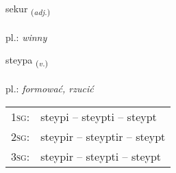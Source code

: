 \documentclass[frontgrid, backgrid]{flacards}\usepackage[]{graphicx}\usepackage[]{xcolor}
\begin{document}
\renewcommand{\flhead}{\vskip5pt \fboxsep=0pt {\small\bfseries\footnotesize Lýsingarorð | przymiotnik}}
\renewcommand{\fcfoot}{\vskip5pt \fboxsep=0pt \hspace{2pt}{\small\bfseries\footnotesize 3K}}

\renewcommand{\blhead}{\vskip5pt {\small\bfseries\footnotesize Lýsingarorð | przymiotnik }}
\renewcommand{\bcfoot}{\vskip5pt \hspace{2pt}{\small\bfseries\footnotesize 3K}}


{sekur \small{\textsubscript{(\textit{adj.})}} \\[1ex] %
\textphonetic{[sɛːkʏr]} \\
pl.: \emph{winny} \\  [2ex]
\renewcommand*{\arraystretch}{0.8}
}

\renewcommand{\flhead}{\vskip5pt \fboxsep=0pt {\small\bfseries\footnotesize Sagnorð | czasownik}}
\renewcommand{\fcfoot}{\vskip5pt \fboxsep=0pt \hspace{2pt}{\small\bfseries\footnotesize 3K}}

\renewcommand{\blhead}{\vskip5pt {\small\bfseries\footnotesize Sagnorð | czasownik }}
\renewcommand{\bcfoot}{\vskip5pt \hspace{2pt}{\small\bfseries\footnotesize 3K}}


{steypa \small{\textsubscript{(\textit{v.})}} \\[1ex] %
\textphonetic{[steiːpa]} \\
pl.: \emph{formować, rzucić} \\  [2ex]
\renewcommand*{\arraystretch}{0.8}
\begin{tabular}{p{1cm}l}
\textsc{1sg}: & steypi -- steypti -- steypt \\ 
\textsc{2sg}: & steypir -- steyptir -- steypt \\ 
\textsc{3sg}: & steypir -- steypti -- steypt \\ 
\end{tabular}
}
\end{document}
